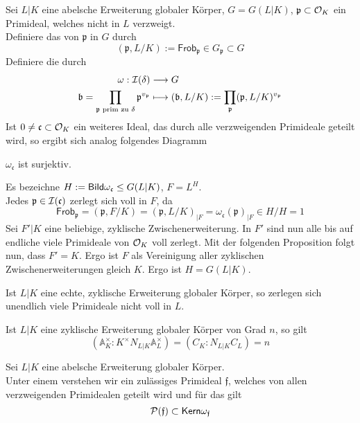 \documentclass{book}
\renewcommand{\A}{\mathbb{A}}
\renewcommand{\bf}{\mathfrak{b}}
\newcommand{\cf}{\mathfrak{c}}
\newcommand{\ff}{\mathfrak{f}}
\newcommand{\pf}{\mathfrak{p}}
\newcommand{\Frob}{\textsf{Frob}}
\begin{document}
Sei $L|K$ eine abelsche Erweiterung globaler Körper, $G = G(L|K)$, $\pf \subset \O_K$ ein Primideal, welches nicht in $L$ verzweigt.\\
Definiere das  von $\pf$ in $G$ durch
\[ (\pf, L/K) := \Frob_\pf \in G_\pf \subset G \]
Definiere die  durch
\begin{align*}
\omega : \I(\delta) & \Pfeil{} G\\
\bf = \prod_{\pf \text{ prim zu }\delta} \pf^{v_{\pf}} & \longmapsto (\bf,L/K) := \prod_{\pf} (\pf, L/K)^{v_\pf}
\end{align*}
Ist $0\neq \cf \subset \O_K$ ein weiteres Ideal, das durch alle verzweigenden Primideale geteilt wird, so ergibt sich analog folgendes Diagramm
\begin{center}
\end{center}

\Satz{}
$\omega_\cf$ ist surjektiv.
\begin{Beweis}{}
Es bezeichne $H := \Img \omega_\cf \leq G(L|K)$, $F = L^H$.\\
Jedes $\pf \in \I(\cf)$ zerlegt sich voll in $F$, da
\[ \Frob_\pf =  (\pf, F/K) =(\pf, L/K)_{|F} = \omega_\cf(\pf)_{|F} \in H/H = 1 \]
Sei $F'|K$ eine beliebige, zyklische Zwischenerweiterung. In $F'$ sind nun alle bis auf endliche viele Primideale von $\mathcal{O}_K$ voll zerlegt. Mit der folgenden Proposition folgt nun, dass $F' = K$. Ergo ist $F$ als Vereinigung aller zyklischen Zwischenerweiterungen gleich $K$. Ergo ist $H = G(L|K)$.
\end{Beweis}

\Prop{}
Ist $L|K$ eine echte, zyklische Erweiterung globaler Körper, so zerlegen sich unendlich viele Primideale nicht voll in $L$.

\Satz{}
Ist $L|K$ eine zyklische Erweiterung globaler Körper von Grad $n$, so gilt
\[ (\A_K^\times : K^\times N_{L|K} \A_L^\times ) = (C_K : N_{L|K}C_L) = n \]

Sei $L|K$ eine abelsche Erweiterung globaler Körper.\\
Unter einem  verstehen wir ein zulässiges Primideal $\ff$, welches von allen verzweigenden Primidealen geteilt wird und für das gilt
\[ \P(\ff) \subset \Ker \omega_\ff \]
\end{document}
